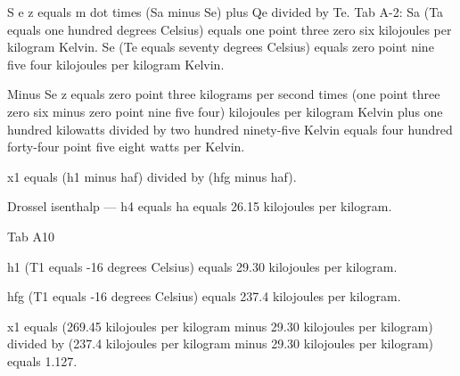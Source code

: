 S e z equals m dot times (Sa minus Se) plus Qe divided by Te. 
Tab A-2: Sa (Ta equals one hundred degrees Celsius) equals one point three zero six kilojoules per kilogram Kelvin. 
Se (Te equals seventy degrees Celsius) equals zero point nine five four kilojoules per kilogram Kelvin. 

Minus Se z equals zero point three kilograms per second times (one point three zero six minus zero point nine five four) kilojoules per kilogram Kelvin plus one hundred kilowatts divided by two hundred ninety-five Kelvin equals four hundred forty-four point five eight watts per Kelvin.

x1 equals (h1 minus haf) divided by (hfg minus haf).

Drossel isenthalp — h4 equals ha equals 26.15 kilojoules per kilogram.

Tab A10

h1 (T1 equals -16 degrees Celsius) equals 29.30 kilojoules per kilogram.

hfg (T1 equals -16 degrees Celsius) equals 237.4 kilojoules per kilogram.

x1 equals (269.45 kilojoules per kilogram minus 29.30 kilojoules per kilogram) divided by (237.4 kilojoules per kilogram minus 29.30 kilojoules per kilogram) equals 1.127.